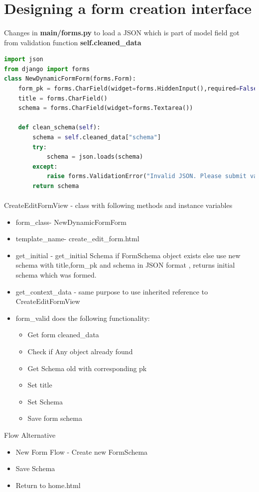 \section{Designing a form creation interface}
\paragraph{}Changes in \textbf{main/forms.py} to load a JSON which is part of model field got from validation function \textbf{self.cleaned\_data}

\begin{lstlisting}[language=python,numbers=none]
import json
from django import forms
class NewDynamicFormForm(forms.Form):
	form_pk = forms.CharField(widget=forms.HiddenInput(),required=False)
	title = forms.CharField()
	schema = forms.CharField(widget=forms.Textarea())

	def clean_schema(self):
		schema = self.cleaned_data["schema"]
		try:
			schema = json.loads(schema)
		except:
			raise forms.ValidationError("Invalid JSON. Please submit valid JSON for the schema")
		return schema
\end{lstlisting}
\newpage
\paragraph{} CreateEditFormView - class with following methods and instance variables
\begin{itemize}
\item form\_class- NewDynamicFormForm
\item template\_name- create\_edit\_form.html
\item get\_initial - get\_initial Schema if FormSchema object exists else use new schema with title,form\_pk and schema in JSON format , returns initial schema which was formed.
\item  get\_context\_data - same purpose to use inherited reference to CreateEditFormView
\item form\_valid does the following functionality:
\begin{itemize}
	
\item Get form cleaned\_data
\item Check if Any object already found
\item Get Schema old with corresponding pk
\item Set title
\item Set Schema
\item Save form schema
\end{itemize}
\end{itemize}
Flow Alternative
\begin{itemize}
	
\item New Form Flow  - Create new FormSchema
\item Save Schema
\item Return to home.html
\end{itemize}

